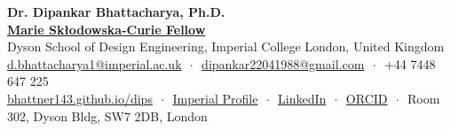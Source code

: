 \documentclass[9pt,a4paper]{extarticle}
\newcommand{\makerubric}[1]{}
\begin{document}
\begin{center}
  {\LARGE\bfseries\sffamily\color{accent} Dr. Dipankar Bhattacharya, Ph.D.}\\[0.25em]
  {\bfseries \href{https://cordis.europa.eu/project/id/101205678}{Marie Sk\l{}odowska-Curie Fellow}}\\
  {\small Dyson School of Design Engineering, Imperial College London, United Kingdom}\\[0.4em]
  \footnotesize
  \href{mailto:d.bhattacharya1@imperial.ac.uk}{d.bhattacharya1@imperial.ac.uk} $\,\cdot\,$
  \href{mailto:dipankar22041988@gmail.com}{dipankar22041988@gmail.com} $\,\cdot\,$
  +44 7448 647 225\\
  \href{https://bhattner143.github.io/dips/}{bhattner143.github.io/dips} $\,\cdot\,$
  \href{https://profiles.imperial.ac.uk/d.bhattacharya1/about}{Imperial Profile} $\,\cdot\,$
  \href{https://www.linkedin.com/in/dipankar-bhattacharya-phd-imperial}{LinkedIn} $\,\cdot\,$
  \href{https://orcid.org/0000-0002-4737-9818}{ORCID} $\,\cdot\,$
  Room 302, Dyson Bldg, SW7 2DB, London
\end{center}

\vspace{0.25em}


\makerubric{education}
\makerubric{employment}
\makerubric{teaching}

\makerubric{citations}
\makerubric{grants}
\makerubric{academic}
\makerubric{skills}
\end{document}
